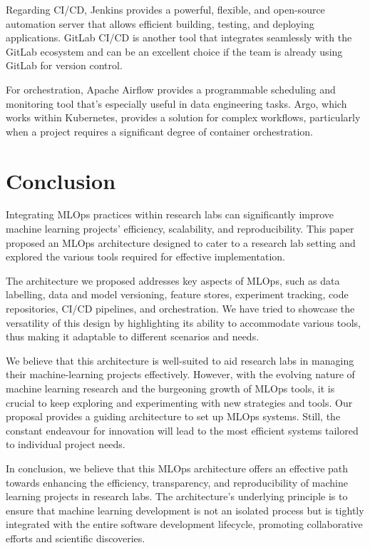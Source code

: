 Regarding CI/CD, Jenkins provides a powerful, flexible, and open-source automation server that allows efficient building, testing, and deploying applications. GitLab CI/CD is another tool that integrates seamlessly with the GitLab ecosystem and can be an excellent choice if the team is already using GitLab for version control.

For orchestration, Apache Airflow provides a programmable scheduling and monitoring tool that's especially useful in data engineering tasks. Argo, which works within Kubernetes, provides a solution for complex workflows, particularly when a project requires a significant degree of container orchestration.

\section{Conclusion \label{conclusion}}
Integrating MLOps practices within research labs can significantly improve machine learning projects' efficiency, scalability, and reproducibility. This paper proposed an MLOps architecture designed to cater to a research lab setting and explored the various tools required for effective implementation.

The architecture we proposed addresses key aspects of MLOps, such as data labelling, data and model versioning, feature stores, experiment tracking, code repositories, CI/CD pipelines, and orchestration. We have tried to showcase the versatility of this design by highlighting its ability to accommodate various tools, thus making it adaptable to different scenarios and needs.

We believe that this architecture is well-suited to aid research labs in managing their machine-learning projects effectively. However, with the evolving nature of machine learning research and the burgeoning growth of MLOps tools, it is crucial to keep exploring and experimenting with new strategies and tools. Our proposal provides a guiding architecture to set up MLOps systems. Still, the constant endeavour for innovation will lead to the most efficient systems tailored to individual project needs.

In conclusion, we believe that this MLOps architecture offers an effective path towards enhancing the efficiency, transparency, and reproducibility of machine learning projects in research labs. The architecture's underlying principle is to ensure that machine learning development is not an isolated process but is tightly integrated with the entire software development lifecycle, promoting collaborative efforts and scientific discoveries.
